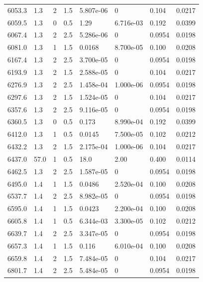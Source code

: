 \documentclass[preview]{standalone}
\begin{document}
{{{\begin{tabular}{L{1.2cm}C{1.2cm} C{0.3cm}C{0.5cm} C{1.4cm}C{1.4cm} C{1.4cm}C{1.4cm}}
  6053.3  &   1.3  & 2     & 1.5 &  5.807e-06  & 0  & 0.104 &  0.0217   \\ 
  6059.5  &   1.3  & 0     & 0.5 &  1.29  & 6.716e-03  & 0.192 &  0.0399   \\ 
  6067.4  &   1.3  & 2     & 2.5 &  5.286e-06  & 0  & 0.0954 &  0.0198   \\ 
  6081.0  &   1.3  & 1     & 1.5 &  0.0168  & 8.700e-05  & 0.100 &  0.0208   \\ 
  6167.4  &   1.3  & 2     & 2.5 &  3.700e-05  & 0  & 0.0954 &  0.0198   \\ 
  6193.9  &   1.3  & 2     & 1.5 &  2.588e-05  & 0  & 0.104 &  0.0217   \\ 
  6276.9  &   1.3  & 2     & 2.5 &  1.458e-04  & 1.000e-06  & 0.0954 &  0.0198   \\ 
  6297.6  &   1.3  & 2     & 1.5 &  1.524e-05  & 0  & 0.104 &  0.0217   \\ 
  6357.6  &   1.3  & 2     & 2.5 &  9.116e-05  & 0  & 0.0954 &  0.0198   \\ 
  6360.5  &   1.3  & 0     & 0.5 &  0.173  & 8.990e-04  & 0.192 &  0.0399   \\ 
  6412.0  &   1.3  & 1     & 0.5 &  0.0145  & 7.500e-05  & 0.102 &  0.0212   \\ 
  6432.2  &   1.3  & 2     & 1.5 &  2.175e-04  & 1.000e-06  & 0.104 &  0.0217   \\ 
  6437.0  &  57.0  & 1     & 0.5 &  18.0  & 2.00  & 0.400 &  0.0114   \\ 
  6462.5  &   1.3  & 2     & 2.5 &  1.587e-05  & 0  & 0.0954 &  0.0198   \\ 
  6495.0  &   1.4  & 1     & 1.5 &  0.0486  & 2.520e-04  & 0.100 &  0.0208   \\ 
  6537.7  &   1.4  & 2     & 2.5 &  8.982e-05  & 0  & 0.0954 &  0.0198   \\ 
  6595.0  &   1.4  & 1     & 1.5 &  0.0423  & 2.200e-04  & 0.100 &  0.0208   \\ 
  6605.8  &   1.4  & 1     & 0.5 &  6.344e-03  & 3.300e-05  & 0.102 &  0.0212   \\ 
  6639.7  &   1.4  & 2     & 2.5 &  3.347e-05  & 0  & 0.0954 &  0.0198   \\ 
  6657.3  &   1.4  & 1     & 1.5 &  0.116  & 6.010e-04  & 0.100 &  0.0208   \\ 
  6659.8  &   1.4  & 2     & 1.5 &  7.484e-05  & 0  & 0.104 &  0.0217   \\ 
  6801.7  &   1.4  & 2     & 2.5 &  5.484e-05  & 0  & 0.0954 &  0.0198   \\ 

\end{tabular}}}}
\end{document}

